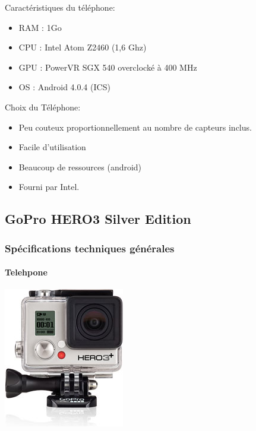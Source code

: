 \documentclass[transparent]{beamer}
\begin{document}
\begin{frame} 
	\begin{block}{Caractéristiques du téléphone:}
			\begin{itemize}
				\item RAM : 1Go
				\item CPU : Intel Atom Z2460 (1,6 Ghz)
				\item GPU : PowerVR SGX 540 overclocké à 400 MHz
				\item OS : Android 4.0.4 (ICS)
			\end{itemize}
	\end{block}
	\begin{block}{Choix du Téléphone:}
			\begin{itemize}
				\item Peu couteux proportionnellement au nombre de capteurs inclus.
				\item Facile d'utilisation
				\item Beaucoup de ressources (android)
				\item Fourni par Intel.
			\end{itemize}
	\end{block}

\end{frame}

\subsection{GoPro HERO3 Silver Edition}
\begin{frame}
	\frametitle{Spécifications techniques générales}
	\framesubtitle{Telehpone}
	\begin{center}
 	\includegraphics[height=0.8\textheight]{images/gopro.jpg} 
	\end{center}

\end{frame}
\end{document}
